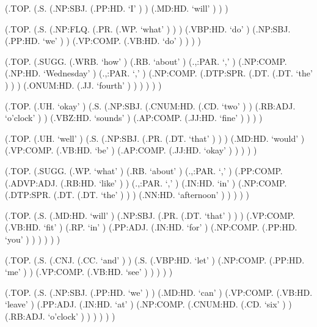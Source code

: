 \documentclass[10pt]{article}
\begin{document}
\begin{parsetree}  (.TOP. (.S. (.NP:SBJ. (.PP:HD. `I' ) ) (.MD:HD. `will' ) ) ) \end{parsetree}

\begin{parsetree}  (.TOP. (.S. (.NP:FLQ. (.PR. (.WP. `what' ) ) ) (.VBP:HD. `do' ) (.NP:SBJ. (.PP:HD. `we' ) ) (.VP:COMP. (.VB:HD. `do' ) ) ) ) \end{parsetree}

\begin{parsetree}  (.TOP. (.SUGG. (.WRB. `how' ) (.RB. `about' ) (.,:PAR. `,' ) (.NP:COMP. (.NP:HD. `Wednesday' ) (.,:PAR. `,' ) (.NP:COMP. (.DTP:SPR. (.DT. (.DT. `the' ) ) ) (.ONUM:HD. (.JJ. `fourth' ) ) ) ) ) ) \end{parsetree}

\begin{parsetree}  (.TOP. (.UH. `okay' ) (.S. (.NP:SBJ. (.CNUM:HD. (.CD. `two' ) ) (.RB:ADJ. `o'clock' ) ) (.VBZ:HD. `sounds' ) (.AP:COMP. (.JJ:HD. `fine' ) ) ) ) \end{parsetree}

\begin{parsetree}  (.TOP. (.UH. `well' ) (.S. (.NP:SBJ. (.PR. (.DT. `that' ) ) ) (.MD:HD. `would' ) (.VP:COMP. (.VB:HD. `be' ) (.AP:COMP. (.JJ:HD. `okay' ) ) ) ) ) \end{parsetree}

\begin{parsetree}  (.TOP. (.SUGG. (.WP. `what' ) (.RB. `about' ) (.,:PAR. `,' ) (.PP:COMP. (.ADVP:ADJ. (.RB:HD. `like' ) ) (.,:PAR. `,' ) (.IN:HD. `in' ) (.NP:COMP. (.DTP:SPR. (.DT. (.DT. `the' ) ) ) (.NN:HD. `afternoon' ) ) ) ) ) \end{parsetree}

\begin{parsetree}  (.TOP. (.S. (.MD:HD. `will' ) (.NP:SBJ. (.PR. (.DT. `that' ) ) ) (.VP:COMP. (.VB:HD. `fit' ) (.RP. `in' ) (.PP:ADJ. (.IN:HD. `for' ) (.NP:COMP. (.PP:HD. `you' ) ) ) ) ) ) \end{parsetree}

\begin{parsetree}  (.TOP. (.S. (.CNJ. (.CC. `and' ) ) (.S. (.VBP:HD. `let' ) (.NP:COMP. (.PP:HD. `me' ) ) (.VP:COMP. (.VB:HD. `see' ) ) ) ) ) \end{parsetree}

\begin{parsetree}  (.TOP. (.S. (.NP:SBJ. (.PP:HD. `we' ) ) (.MD:HD. `can' ) (.VP:COMP. (.VB:HD. `leave' ) (.PP:ADJ. (.IN:HD. `at' ) (.NP:COMP. (.CNUM:HD. (.CD. `six' ) ) (.RB:ADJ. `o'clock' ) ) ) ) ) ) \end{parsetree}
\end{document}
